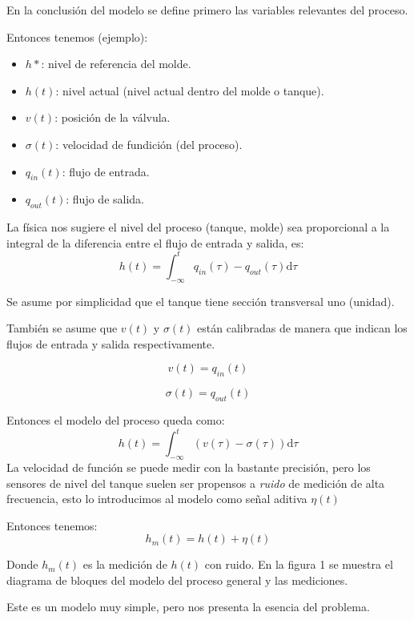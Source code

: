 \documentclass[a4paper]{article}
\begin{document}
En la conclusión del modelo se define primero las variables relevantes del proceso.

Entonces tenemos (ejemplo):
\begin{itemize}
\item $h*$: nivel de referencia del molde.
\item $h(t)$: nivel actual (nivel actual dentro del molde o tanque).
\item $v(t)$: posición de la válvula.
\item $\sigma(t)$: velocidad de fundición (del proceso).
\item $q_{in}(t)$: flujo de entrada.
\item $q_{out}(t)$: flujo de salida.
\end{itemize}

La física nos sugiere el nivel del proceso (tanque, molde) sea proporcional a la integral de la diferencia entre el flujo de entrada y salida, es:
\begin{equation}\label{eq:altura}
		h(t) = \int_{-\infty}^{t}q_{in} (\tau) - q_{out} (\tau) \mathrm{d}\tau
\end{equation}

Se asume por simplicidad que el tanque tiene sección transversal uno (unidad).

También se asume que $v(t)$ y $\sigma(t)$ están calibradas de manera que indican los flujos de entrada y salida respectivamente.

\begin{equation}\label{eq:valvula}
		v(t) = q_{in} (t)
\end{equation}

\begin{equation}\label{eq:velocidad}
		\sigma (t) = q_{out} (t)
\end{equation}

Entonces el modelo del proceso queda como:
\begin{equation}\label{eq:altura2}
		h(t) = \int_{-\infty}^{t}(v(\tau) - \sigma(\tau)) \mathrm{d}\tau
\end{equation}
La velocidad de función se puede medir con la bastante precisión, pero los sensores de nivel del tanque suelen ser propensos a \emph{ruido} de medición de alta frecuencia, esto lo introducimos al modelo como señal aditiva $\eta(t)$

Entonces tenemos:
\begin{equation}\label{eq:ruido}
h_{m} (t) = h(t) + \eta(t)
\end{equation}

Donde $h_m(t)$ es la medición de $h(t)$ con ruido. En la figura 1 se muestra el diagrama de bloques del modelo del proceso general y las mediciones.

Este es un modelo muy simple, pero nos presenta la esencia del problema.
\end{document}
